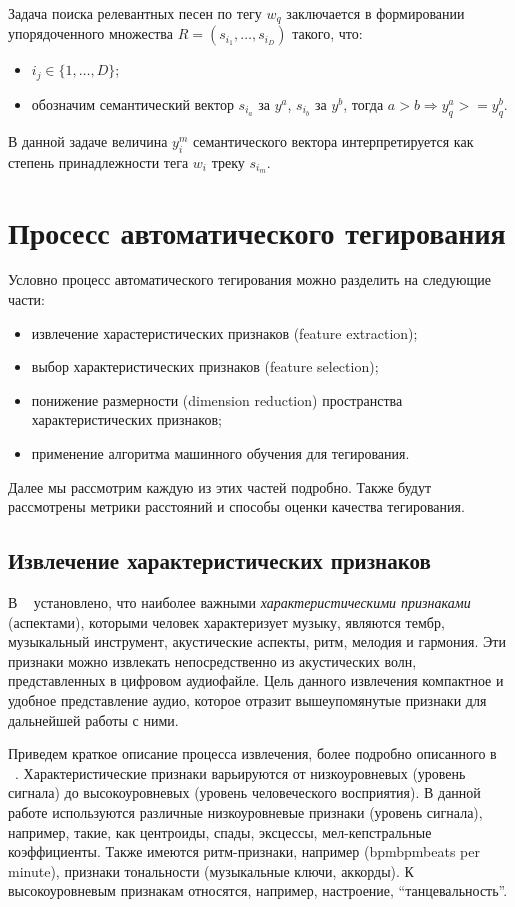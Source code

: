 Задача поиска релевантных песен по тегу $w_q$ заключается в формировании упорядоченного множества $R = (s_{i_1}, \ldots, s_{i_D})$ такого, что:
\begin{itemize}
 \item $i_j \in \{1, \ldots, D \}$;
 \item обозначим семантический вектор $s_{i_a}$ за $y^a$, $s_{i_b}$ \ld за $y^b$, тогда $a > b \Rightarrow y^a_q >= y^b_q $.
\end{itemize}
В данной задаче величина $y^m_i$ семантического вектора интерпретируется как степень принадлежности тега $w_i$ треку $s_{i_m}$. 
 
\section{Просесс автоматического тегирования}

Условно процесс автоматического тегирования можно разделить на следующие части:
\begin{itemize}
 \item извлечение харастеристических признаков (feature extraction);
 \item выбор характеристических признаков (feature selection);
 \item понижение размерности (dimension reduction) пространства характеристических признаков;
 \item применение алгоритма машинного обучения для тегирования.
\end{itemize}

Далее мы рассмотрим каждую из этих частей подробно. Также будут рассмотрены метрики расстояний и способы оценки качества тегирования.

\subsection{Извлечение характеристических признаков}

В ~\cite{orio} установлено, что наиболее важными \emph{характеристическими признаками} (аспектами), 
которыми человек характеризует музыку, являются тембр, музыкальный инструмент, акустические аспекты, ритм, мелодия и гармония.
Эти признаки можно извлекать непосредственно из акустических волн, представленных в цифровом аудиофайле. Цель данного извлечения \ld компактное и удобное
представление аудио, которое отразит вышеупомянутые признаки для дальнейшей работы с ними.

Приведем краткое описание процесса извлечения, более подробно описанного в ~\cite{msordo_thesis}.
Характеристические признаки варьируются от низкоуровневых (уровень сигнала) до высокоуровневых (уровень человеческого восприятия).
В данной работе используются различные низкоуровневые признаки (уровень сигнала), например, такие, как центроиды, спады, эксцессы, мел-кепстральные коэффициенты.
Также имеются ритм-признаки, например (bpm{bpm\ld beats per minute}), признаки тональности (музыкальные ключи, аккорды). К высокоуровневым признакам относятся, 
например, настроение, ``танцевальность''.

